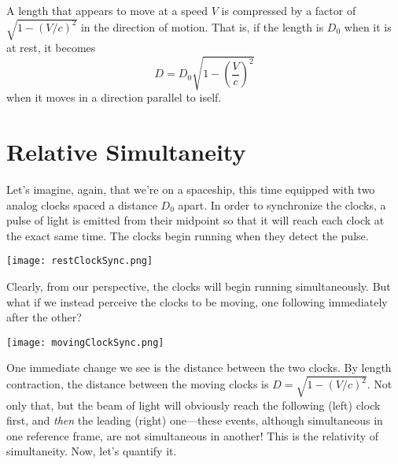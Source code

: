 \documentclass[../p023main.tex]{subfiles}
\begin{document}
\begin{summary}
    A length that appears to move at a speed $V$ is compressed by a factor of $\sqrt{1 - \left( V / c \right)^2}$ in the direction of motion.
    That is, if the length is $D_0$ when it is at rest, it becomes
    \[ D = D_0 \sqrt{1 - \left( \frac{V}{c} \right)^2} \]
    when it moves in a direction parallel to iself.
\end{summary}
\pagebreak

\section{Relative Simultaneity}
Let's imagine, again, that we're on a spaceship, this time equipped with two analog clocks spaced a distance $D_0$ apart.
In order to synchronize the clocks, a pulse of light is emitted from their midpoint so that it will reach each clock at the exact same time.
The clocks begin running when they detect the pulse.
\begin{center}
    \texttt{[image: restClockSync.png]}
\end{center}
Clearly, from our perspective, the clocks will begin running simultaneously.
But what if we instead perceive the clocks to be moving, one following immediately after the other?
\begin{center}
    \texttt{[image: movingClockSync.png]}
\end{center}
One immediate change we see is the distance between the two clocks.
By length contraction, the distance between the moving clocks is $D = \sqrt{1 - \left( V / c \right)^2}$.
Not only that, but the beam of light will obviously reach the following (left) clock first, and \textit{then} the leading (right) one---these events, although simultaneous in one reference frame, are not simultaneous in another!
This is the relativity of simultaneity.
Now, let's quantify it.
\end{document}

